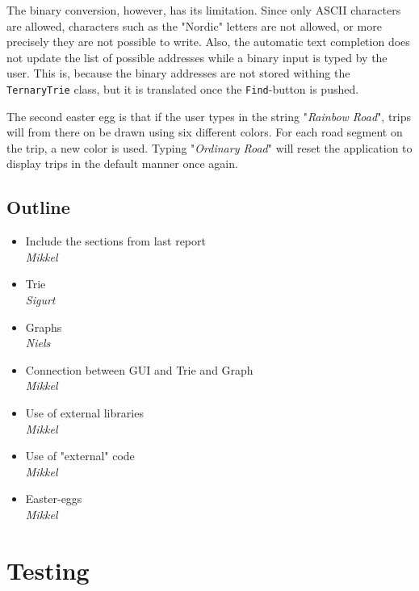 \documentclass[a4paper,11pt]{article}
\begin{document}
The binary conversion, however, has its limitation. Since only ASCII characters are allowed, characters such as the "Nordic" letters are not allowed, or more precisely they are not possible to write. Also, the automatic text completion does not update the list of possible addresses while a binary input is typed by the user. This is, because the binary addresses are not stored withing the \texttt{TernaryTrie} class, but it is translated once the \texttt{Find}-button is pushed.

The second easter egg is that if the user types in the string "\textit{Rainbow Road}", trips will from there on be drawn using six different colors. For each road segment on the trip, a new color is used. Typing "\textit{Ordinary Road}" will reset the application to display trips in the default manner once again.

\subsection{Outline}
\begin{itemize}
	\item Include the sections from last report \\
		\textsl{Mikkel}
	\item Trie \\
		\textsl{Sigurt}
	\item Graphs \\
		\textsl{Niels}
	\item Connection between GUI and Trie and Graph \\
		\textsl{Mikkel}
	\item Use of external libraries \\
		\textsl{Mikkel}
	\item Use of "external" code \\
		\textsl{Mikkel}
	\item Easter-eggs \\
		\textsl{Mikkel}
\end{itemize}

\pagebreak
\section{Testing}
\label{sec:Testing}
\end{document}
